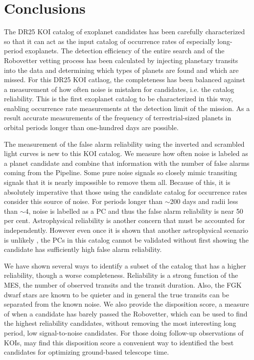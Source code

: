

\section{Conclusions}

The DR25 KOI catalog of exoplanet candidates has been carefully characterized so that it can act as the input catalog of occurrence rates of especially long-period exoplanets. The detection efficiency of the entire search \citep{Burke2017b,Christiansen2017} and of the Robovetter vetting process has been calculated by injecting planetary transits into the data and determining which types of planets are found and which are missed. For this DR25 KOI catlaog, the completeness has been balanced against a measurement of how often noise is mistaken for candidates, i.e. the catalog reliability. This is the first exoplanet catalog to be characterized in this way, enabling occurrence rate measurements at the detection limit of the mission.  As a result accurate measurements of the frequency of terrestrial-sized planets in orbital periods longer than one-hundred days are possible.

The measurement of the false alarm reliability using the inverted and scrambled light curves is new to this KOI catalog. We measure how often noise is labeled as a planet candidate and combine that information with the number of false alarms coming from the \Kepler{} Pipeline. Some pure noise signals so closely mimic transiting signals that it is nearly impossible to remove them all. Because of this, it is absolutely imperative that those using the candidate catalog for occurrence rates consider this source of noise. For periods longer than $\sim$200 days and radii less than $\sim$4\Rearth, noise is labelled as a PC and thus the false alarm reliability is near 50 per cent.  Astrophysical reliability is another concern that must be accounted for independently.  However even once it is shown that another astrophysical scenario is unlikely \citep[as was done for the DR24 KOIs in ][]{Morton2017}, the PCs in this catalog cannot be validated without first showing the candidate has sufficiently high false alarm reliability. 

We have shown several ways to identify a subset of the catalog that has a higher reliability, though a worse completeness. Reliability is a strong function of the MES, the number of observed transits and the transit duration. Also, the FGK dwarf stars are known to be quieter and in general the true transits can be separated from the known noise. We also provide the disposition score, a measure of when a candidate has barely passed the Robovetter, which can be used to find the highest reliability candidates, without removing the most interesting long period, low signal-to-noise candidates. For those doing follow-up observations of KOIs, may find this disposition score a convenient way to identified the best candidates for optimizing ground-based telescope time.

